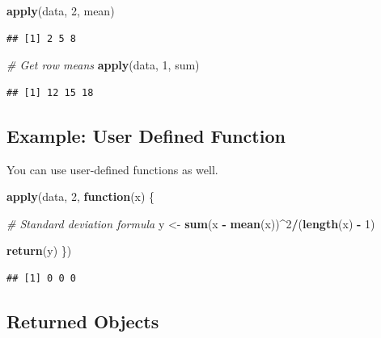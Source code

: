\documentclass[
]{book}
\newenvironment{Shaded}{\begin{snugshade}}{\end{snugshade}}
\newcommand{\CommentTok}[1]{\textcolor[rgb]{0.56,0.35,0.01}{\textit{#1}}}
\newcommand{\ControlFlowTok}[1]{\textcolor[rgb]{0.13,0.29,0.53}{\textbf{#1}}}
\newcommand{\DecValTok}[1]{\textcolor[rgb]{0.00,0.00,0.81}{#1}}
\newcommand{\KeywordTok}[1]{\textcolor[rgb]{0.13,0.29,0.53}{\textbf{#1}}}
\newcommand{\NormalTok}[1]{#1}
\newcommand{\OperatorTok}[1]{\textcolor[rgb]{0.81,0.36,0.00}{\textbf{#1}}}
\newcommand{\StringTok}[1]{\textcolor[rgb]{0.31,0.60,0.02}{#1}}
\begin{document}
\begin{Shaded}
\begin{Highlighting}[]
\KeywordTok{apply}\NormalTok{(data, }\DecValTok{2}\NormalTok{, mean)}
\end{Highlighting}
\end{Shaded}

\begin{verbatim}
## [1] 2 5 8
\end{verbatim}

\begin{Shaded}
\begin{Highlighting}[]
\CommentTok{# Get row means}
\KeywordTok{apply}\NormalTok{(data, }\DecValTok{1}\NormalTok{, sum)}
\end{Highlighting}
\end{Shaded}

\begin{verbatim}
## [1] 12 15 18
\end{verbatim}

\hypertarget{example-user-defined-function}{%
\subsection*{Example: User Defined Function}\label{example-user-defined-function}}

You can use user-defined functions as well.

\begin{Shaded}
\begin{Highlighting}[]
\KeywordTok{apply}\NormalTok{(data, }\DecValTok{2}\NormalTok{, }\ControlFlowTok{function}\NormalTok{(x) \{}

    \CommentTok{# Standard deviation formula}
\NormalTok{    y <-}\StringTok{ }\KeywordTok{sum}\NormalTok{(x }\OperatorTok{-}\StringTok{ }\KeywordTok{mean}\NormalTok{(x))}\OperatorTok{^}\DecValTok{2}\OperatorTok{/}\NormalTok{(}\KeywordTok{length}\NormalTok{(x) }\OperatorTok{-}\StringTok{ }\DecValTok{1}\NormalTok{)}

    \KeywordTok{return}\NormalTok{(y)}
\NormalTok{\})}
\end{Highlighting}
\end{Shaded}

\begin{verbatim}
## [1] 0 0 0
\end{verbatim}

\hypertarget{returned-objects}{%
\subsection{Returned Objects}\label{returned-objects}}
\end{document}
